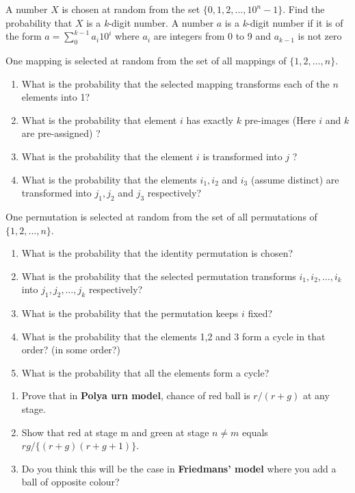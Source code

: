 \documentclass[12pt]{article}
\newenvironment{question}[2][Question]{\begin{trivlist}
\item[\hskip \labelsep {\bfseries #1}\hskip \labelsep {\bfseries #2.}]}{\end{trivlist}}
\begin{document}
\begin{question}{3}
A number $X$ is chosen at random from the set $\{0,1,2,\ldots,10^n-1\}$.
Find the probability that $X$ is a \textit{k}-digit number. A number $a$ is a \textit{k}-digit number if it is of the form $a = \sum_{0}^{k-1}{a_i 10^i}$ where $a_i$ are integers from 0 to 9 and $a_{k-1}$ is not zero
\end{question}

\begin{question}{4}
One mapping is selected at random from the set of all mappings of $\{1,2,\ldots,n\}$.
\begin{enumerate}
\item What is the probability that the selected mapping transforms each of the $n$ elements into 1?
\item What is the probability that element $i$ has exactly $k$ pre-images (Here $i$ and $k$ are pre-assigned) ?
\item What is the probability that the element $i$ is transformed into $j$ ?
\item What is the probability that the elements $i_1,i_2$ and $i_3$ (assume distinct) are transformed into $j_1,j_2$ and $j_3$ respectively?
\end{enumerate}
\end{question}

\begin{question}{5}
One permutation is selected at random from the set of all permutations of $\{1,2,\ldots,n\}$.
\begin{enumerate}
\item What is the probability that the identity permutation is chosen?
\item What is the probability that the selected permutation transforms $i_1,i_2,\ldots,i_k$ into $j_1,j_2,\ldots,j_k$ respectively?
\item What is the probability that the permutation keeps $i$ fixed?
\item What is the probability that the elements 1,2 and 3 form a cycle in that order? (in some order?)
\item What is the probability that all the elements form a cycle?
\end{enumerate}
\end{question}

\begin{question}{6}
\begin{enumerate}
\item Prove that in \textbf{Polya urn model}, chance of red ball is $r/(r+g)$ at any stage.
\item Show that red at stage m and green at stage $n \neq m$ equals $rg/\{(r+g)(r+g+1)\}$.
\item Do you think this will be the case in \textbf{Friedmans' model} where you add a ball of opposite colour?
\end{enumerate}
\end{question}
\end{document}
